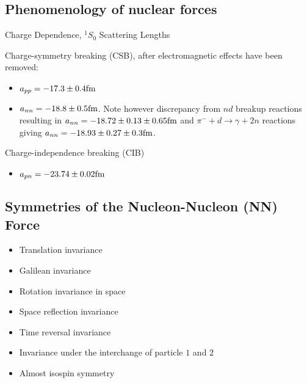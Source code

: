 \documentclass[%
twoside,                 %
final,                   %
10pt]{article}
\begin{document}
\subsection{Phenomenology of nuclear forces}
\begin{block}{Charge Dependence, $^1S_0$ Scattering Lengths }

Charge-symmetry breaking (CSB), after electromagnetic effects
have been removed:
\begin{itemize}
\item $a_{pp}=  -17.3 \pm 0.4 \hspace{0.cm} \mathrm{fm}$

\item $a_{nn}=-18.8 \pm 0.5 \hspace{0.cm} \mathrm{fm}$. Note however discrepancy from $nd$ breakup reactions resulting in  $a_{nn}=-18.72 \pm 0.13 \pm 0.65 \hspace{0.cm} \mathrm{fm}$ and $\pi^- + d \rightarrow \gamma + 2n$ reactions giving  $a_{nn}=-18.93 \pm 0.27 \pm 0.3 \hspace{0.cm} \mathrm{fm}$.
\end{itemize}

\noindent
Charge-independence breaking (CIB)
\begin{itemize}
\item $a_{pn}=  -23.74 \pm 0.02 \hspace{0.cm} \mathrm{fm}$ 
\end{itemize}

\noindent
\end{block}



\subsection{Symmetries of the Nucleon-Nucleon (NN) Force}
\begin{block}{}
\begin{itemize}
\item Translation invariance

\item Galilean invariance

\item Rotation invariance in space

\item Space reflection invariance

\item Time reversal invariance

\item Invariance under the interchange of particle $1$ and $2$

\item Almost isospin symmetry
\end{itemize}

\noindent
\end{block}
\end{document}
